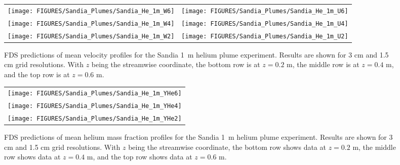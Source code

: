 \begin{figure}[p]
\begin{tabular*}{\textwidth}{l@{\extracolsep{\fill}}r}
\texttt{[image: FIGURES/Sandia\_Plumes/Sandia\_He\_1m\_W6]} &
\texttt{[image: FIGURES/Sandia\_Plumes/Sandia\_He\_1m\_U6]} \\
\texttt{[image: FIGURES/Sandia\_Plumes/Sandia\_He\_1m\_W4]} &
\texttt{[image: FIGURES/Sandia\_Plumes/Sandia\_He\_1m\_U4]} \\
\texttt{[image: FIGURES/Sandia\_Plumes/Sandia\_He\_1m\_W2]} &
\texttt{[image: FIGURES/Sandia\_Plumes/Sandia\_He\_1m\_U2]}
\end{tabular*}
\caption[Sandia 1~m helium plume mean velocity profiles.]
{FDS predictions of mean velocity profiles for the Sandia 1~m helium plume experiment. Results are shown for 3 cm and 1.5 cm grid resolutions. With $z$ being the streamwise coordinate, the bottom row is at $z=0.2$ m, the middle row is at $z=0.4$ m, and the top row is at $z=0.6$ m.}
\label{Sandia_He_1m_velocity}
\end{figure}


\begin{figure}[p]
\begin{center}
\begin{tabular}{c}
\texttt{[image: FIGURES/Sandia\_Plumes/Sandia\_He\_1m\_YHe6]} \\
\texttt{[image: FIGURES/Sandia\_Plumes/Sandia\_He\_1m\_YHe4]} \\
\texttt{[image: FIGURES/Sandia\_Plumes/Sandia\_He\_1m\_YHe2]}
\end{tabular}
\end{center}
\caption[Sandia 1~m helium plume mean mass fraction profiles.]
{FDS predictions of mean helium mass fraction profiles for the Sandia 1~m helium plume experiment. Results are shown for 3 cm and 1.5 cm grid resolutions. With $z$ being the streamwise coordinate, the bottom row shows data at $z=0.2$ m, the middle row shows data at $z=0.4$ m, and the top row shows data at $z=0.6$ m.}
\label{Sandia_He_1m_massfraction}
\end{figure}

\clearpage

